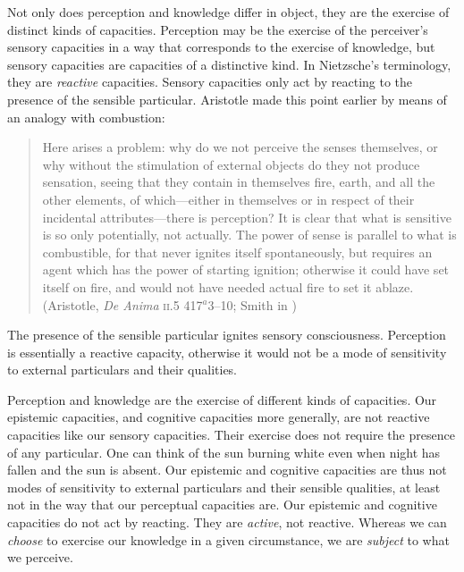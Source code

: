 Not only does perception and knowledge differ in object, they are the exercise of distinct kinds of capacities. Perception may be the exercise of the perceiver's sensory capacities in a way that corresponds to the exercise of knowledge, but sensory capacities are capacities of a distinctive kind. In Nietzsche's \citeyearpar{Nietzsche1887On-the-Genealog} terminology, they are \emph{reactive} capacities. Sensory capacities only act by reacting to the presence of the sensible particular. Aristotle made this point earlier by means of an analogy with combustion:
\begin{quote}
	Here arises a problem: why do we not perceive the senses themselves, or why without the stimulation of external objects do they not produce sensation, seeing that they contain in themselves fire, earth, and all the other elements, of which—either in themselves or in respect of their incidental attributes—there is perception? It is clear that what is sensitive is so only potentially, not actually. The power of sense is parallel to what is combustible, for that never ignites itself spontaneously, but requires an agent which has the power of starting ignition; otherwise it could have set itself on fire, and would not have needed actual fire to set it ablaze. (Aristotle, \emph{De Anima} \textsc{ii}.5 417\( ^{a} \)3--10; Smith in \citealt[29]{Barnes:1984uq})
\end{quote}
The presence of the sensible particular ignites sensory consciousness. Perception is essentially a reactive capacity, otherwise it would not be a mode of sensitivity to external particulars and their qualities.

Perception and knowledge are the exercise of different kinds of capacities. Our epistemic capacities, and cognitive capacities more generally, are not reactive capacities like our sensory capacities. Their exercise does not require the presence of any particular. One can think of the sun burning white even when night has fallen and the sun is absent. Our epistemic and cognitive capacities are thus not modes of sensitivity to external particulars and their sensible qualities, at least not in the way that our perceptual capacities are. Our epistemic and cognitive capacities do not act by reacting. They are \emph{active}, not reactive. Whereas we can \emph{choose} to exercise our knowledge in a given circumstance, we are \emph{subject} to what we perceive. 

